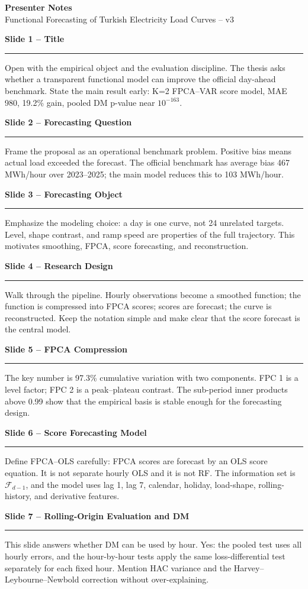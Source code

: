 \documentclass[11pt,a4paper]{article}
\newcommand{\slidenote}[2]{%
  {\large\textbf{#1}}\par
  {\color{rulegray}\rule{\linewidth}{0.4pt}}\par
  \small #2\par\vspace{0.85em}
}
\begin{document}
\begin{center}
  {\Large\textbf{Presenter Notes}}\\[2pt]
  {\small Functional Forecasting of Turkish Electricity Load Curves -- v3}
\end{center}

\slidenote{Slide 1 -- Title}{
Open with the empirical object and the evaluation discipline. The thesis asks
whether a transparent functional model can improve the official day-ahead
benchmark. State the main result early: K=2 FPCA--VAR score model, MAE 980,
19.2\% gain, pooled DM p-value near $10^{-163}$.
}

\slidenote{Slide 2 -- Forecasting Question}{
Frame the proposal as an operational benchmark problem. Positive bias means
actual load exceeded the forecast. The official benchmark has average bias
467 MWh/hour over 2023--2025; the main model reduces this to 103 MWh/hour.
}

\slidenote{Slide 3 -- Forecasting Object}{
Emphasize the modeling choice: a day is one curve, not 24 unrelated targets.
Level, shape contrast, and ramp speed are properties of the full trajectory.
This motivates smoothing, FPCA, score forecasting, and reconstruction.
}

\slidenote{Slide 4 -- Research Design}{
Walk through the pipeline. Hourly observations become a smoothed function;
the function is compressed into FPCA scores; scores are forecast; the curve is
reconstructed. Keep the notation simple and make clear that the score forecast
is the central model.
}

\slidenote{Slide 5 -- FPCA Compression}{
The key number is 97.3\% cumulative variation with two components. FPC 1 is
a level factor; FPC 2 is a peak--plateau contrast. The sub-period inner
products above 0.99 show that the empirical basis is stable enough for the
forecasting design.
}

\slidenote{Slide 6 -- Score Forecasting Model}{
Define FPCA--OLS carefully: FPCA scores are forecast by an OLS score equation.
It is not separate hourly OLS and it is not RF. The information set is
$\mathcal{F}_{d-1}$, and the model uses lag 1, lag 7, calendar, holiday,
load-shape, rolling-history, and derivative features.
}

\slidenote{Slide 7 -- Rolling-Origin Evaluation and DM}{
This slide answers whether DM can be used by hour. Yes: the pooled test uses
all hourly errors, and the hour-by-hour tests apply the same loss-differential
test separately for each fixed hour. Mention HAC variance and the
Harvey--Leybourne--Newbold correction without over-explaining.
}
\end{document}
